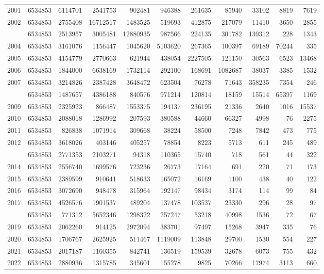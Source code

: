 \documentclass[
]{article}
\begin{document}
\begin{longtable}[t]{lrrrrrrrrrr}
2001 & 6534853 & 6114701 & 2541753 & 902481 & 946388 & 261635 & 85940 & 33102 & 8819 & 7619\\
2002 & 6534853 & 2755408 & 16712517 & 1483525 & 519693 & 412875 & 217079 & 11410 & 3650 & 2855\\
\addlinespace
2003 & 6534853 & 2513957 & 3005481 & 12880935 & 987566 & 224135 & 301782 & 139312 & 228 & 1343\\
2004 & 6534853 & 3161076 & 1156447 & 1045620 & 5103620 & 267365 & 100397 & 69189 & 70244 & 335\\
2005 & 6534853 & 4154779 & 2770663 & 621944 & 438054 & 2227505 & 121150 & 30563 & 6523 & 13468\\
2006 & 6534853 & 1844000 & 6638169 & 1732114 & 292100 & 168691 & 1082687 & 38037 & 3385 & 1532\\
2007 & 6534853 & 3214826 & 2387428 & 3648472 & 623504 & 76278 & 71643 & 358235 & 7354 & 246\\
\addlinespace
2008 & 6534853 & 1487657 & 4386188 & 840576 & 971214 & 120814 & 18159 & 15514 & 65397 & 1169\\
2009 & 6534853 & 2325923 & 866487 & 1553375 & 194137 & 236195 & 21336 & 2640 & 1016 & 15537\\
2010 & 6534853 & 2088018 & 1286992 & 207593 & 380588 & 44660 & 66327 & 4998 & 76 & 2275\\
2011 & 6534853 & 826838 & 1071914 & 309668 & 38224 & 58500 & 7248 & 7842 & 473 & 775\\
2012 & 6534853 & 3618026 & 403146 & 405257 & 78854 & 8223 & 5713 & 611 & 245 & 489\\
\addlinespace
2013 & 6534853 & 2771353 & 2103271 & 94318 & 110365 & 15740 & 718 & 561 & 44 & 322\\
2014 & 6534853 & 2556740 & 1699576 & 723236 & 26773 & 17164 & 691 & 220 & 71 & 173\\
2015 & 6534853 & 2389599 & 910641 & 518633 & 165072 & 16169 & 1100 & 438 & 40 & 122\\
2016 & 6534853 & 3072690 & 948478 & 315964 & 192147 & 98434 & 3174 & 114 & 99 & 84\\
2017 & 6534853 & 4526576 & 1901537 & 489204 & 137478 & 103537 & 23330 & 296 & 28 & 97\\
\addlinespace
2018 & 6534853 & 771312 & 5652346 & 1298322 & 257247 & 53218 & 40998 & 1536 & 72 & 67\\
2019 & 6534853 & 2062260 & 914125 & 2972094 & 383701 & 97497 & 15268 & 3947 & 335 & 76\\
2020 & 6534853 & 1706767 & 2625925 & 511467 & 1119009 & 113848 & 29700 & 1530 & 554 & 227\\
2021 & 6534853 & 2017187 & 1160355 & 842741 & 136519 & 159539 & 32678 & 6073 & 755 & 432\\
2022 & 6534853 & 2880936 & 1315785 & 345601 & 155278 & 9825 & 70266 & 17974 & 3113 & 660\\*
\end{longtable}
\end{document}
